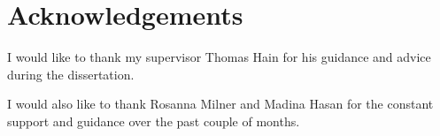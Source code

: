 \chapter*{\Large \center Acknowledgements}

I would like to thank my supervisor Thomas Hain for his guidance and advice during the dissertation.

I would also like to thank Rosanna Milner and Madina Hasan for the constant support and guidance over the past couple of months.